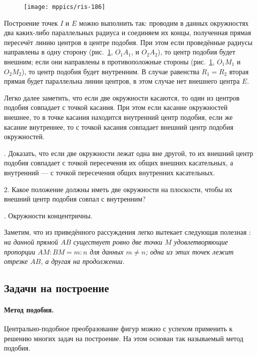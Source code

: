 \documentclass[oneside]{book}
\begin{document}
\begin{figure}[h]
\centering
\texttt{[image: mppics/ris-186]}
\caption{}\label{1938/ris-186}
\end{figure}

Построение точек $I$ и $E$ можно выполнить так:
проводим в данных окружностях два каких-либо параллельных радиуса и соединяем их концы, полученная прямая пересечёт линию центров в центре подобия.
При этом если проведённые радиусы направлены в одну сторону (рис.~\ref{1938/ris-186}, $O_1A_1$, и $O_2A_2$), то центр подобия будет внешним;
если они направлены в противоположные стороны (рис.~\ref{1938/ris-186}, $O_1M_1$ и $O_2M_2$), то центр подобия будет внутренним.
В случае равенства $R_1=R_2$ вторая прямая будет параллельна линии центров, в этом случае нет внешнего центра $E$.

\smallskip

Легко далее заметить, что если две окружности касаются, то один из центров подобия совпадает с точкой касания.
При этом если касание окружностей внешнее, то в точке касания находится внутренний центр подобия, если же касание внутреннее, то с точкой касания совпадает внешний центр подобия окружностей.

\smallskip
{}.
Доказать, что если две окружности лежат одна вне другой, то их внешний центр подобия совпадает с точкой пересечения их общих внешних касательных, а внутренний — с точкой пересечения общих внутренних касательных.

2.
Какое положение должны иметь две окружности на плоскости, чтобы их внешний центр подобия совпал с внутренним? 

\smallskip
{}.
Окружности концентричны.

\smallskip

Заметим, что из приведённого рассуждения легко вытекает следующая полезная :
\emph{на данной прямой $AB$ существует ровно две точки $M$ удовлетворяющие пропорции $AM:BM=m:n$ для данных $m\ne n$;
одна из этих точек лежит отрезке $AB$, а другая на продолжении. 
}

\subsection*{Задачи на построение}

\paragraph{Метод подобия.}\label{1938/181}
Центрально-подобное преобразование фигур можно с успехом применить к решению многих задач на построение.
На этом основан так называемый метод подобия.
\end{document}
